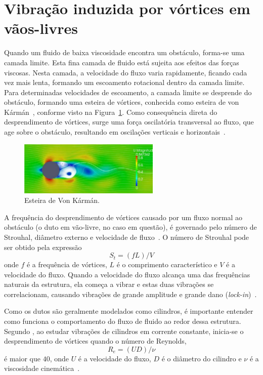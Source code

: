 \section{Vibração induzida por vórtices em vãos-livres}\label{sec:viv}

Quando um fluido de baixa viscosidade encontra um obstáculo, forma-se uma camada limite.
Esta fina camada de fluido está sujeita aos efeitos das forças viscosas.
Nesta camada, a velocidade do fluxo varia rapidamente, ficando cada vez mais lenta, formando um escoamento rotacional dentro da camada limite.
Para determinadas velocidades de escoamento, a camada limite se desprende do obstáculo, formando uma esteira de vórtices, conhecida como esteira de von Kármán~\cite{Currie2002}, conforme visto na Figura~\ref{fig:viv_shading}.
Como consequência direta do desprendimento de vórtices, surge uma força oscilatória transversal ao fluxo, que age sobre o obstáculo, resultando em oscilações verticais e horizontais~\cite{Nielsen2002}.

\begin{figure}[!ht]
    \centering
    \caption{Esteira de Von Kármán.}\label{fig:viv_shading}
    \includegraphics[width=0.6\textwidth]{imagens/viv_shading}
\end{figure}

A frequência do desprendimento de vórtices causado por um fluxo normal ao obstáculo (o duto em vão-livre, no caso em questão), é governado pelo número de Strouhal, diâmetro externo e velocidade de fluxo~\cite{Mork2003}.
O número de Strouhal pode ser obtido pela expressão
\begin{equation}
    S_t = (f L) / V
\end{equation}
onde $f$ é a frequência de vórtices, $L$ é o comprimento característico e $V$ é a velocidade do fluxo.
Quando a velocidade do fluxo alcança uma das frequências naturais da estrutura, ela começa a vibrar e estas duas vibrações se correlacionam, causando vibrações de grande amplitude e grande dano (\textit{lock-in})~\cite{Mork2003}.

Como os dutos são geralmente modelados como cilindros, é importante entender como funciona o comportamento do fluxo de fluido ao redor dessa estrutura. Segundo , ao estudar vibrações de cilindros em corrente constante, inicia-se o desprendimento de vórtices quando o número de Reynolds,
\begin{equation}
    R_e = (U D)/\nu
\end{equation}
é maior que $40$, onde $U$ é a velocidade do fluxo, $D$ é o diâmetro do cilindro e $\nu$ é a viscosidade cinemática~\cite{Sumer1995}.

